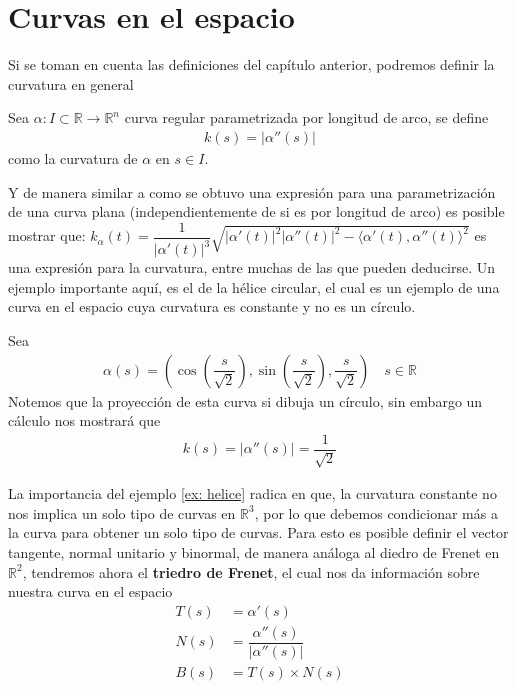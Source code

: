 \documentclass[oneside,11pt]{memoir}
\begin{document}
\section{Curvas en el espacio}
Si se toman en cuenta las definiciones del capítulo anterior, podremos definir la curvatura en general
\begin{definition}
    Sea $\alpha:I\subset \mathbb{R}\to\mathbb{R}^n$ curva regular parametrizada por longitud de arco, se define 
    \begin{align*}
        k(s)=|\alpha''(s)|
    \end{align*}
    como la curvatura de $\alpha$ en $s\in I$.
\end{definition}
Y de manera similar a como se obtuvo una expresión para una parametrización de una curva plana (independientemente de si es por longitud de arco) es posible mostrar que: $k_\alpha(t) =\dfrac{1}{|\alpha'(t)|^3}\sqrt{|\alpha'(t)|^2|\alpha''(t)|^2-\langle\alpha'(t),\alpha''(t)\rangle^2}$ es una expresión para la curvatura, entre muchas de las que pueden deducirse. Un ejemplo importante aquí, es el de la hélice circular, el cual es un ejemplo de una curva en el espacio cuya curvatura es constante y no es un círculo.
\begin{example}\label{ex: helice}
    Sea 
    \begin{align*}
        \alpha(s)=\left(\cos\left(\dfrac{s}{\sqrt{2}}\right),\sin\left(\dfrac{s}{\sqrt{2}}\right),\dfrac{s}{\sqrt{2}}\right)\quad s\in \mathbb{R}
    \end{align*}
    Notemos que la proyección de esta curva si dibuja un círculo, sin embargo un cálculo nos mostrará que
    \begin{align*}
        k(s)=|\alpha''(s)|=\dfrac{1}{\sqrt{2}}
    \end{align*}
\end{example}
La importancia del ejemplo \ref{ex: helice} radica en que, la curvatura constante no nos implica un solo tipo de curvas en $\mathbb{R}^3$, por lo que debemos condicionar más a la curva para obtener un solo tipo de curvas. Para esto es posible definir el vector tangente, normal unitario y binormal, de manera análoga al diedro de Frenet en $\mathbb{R}^2$, tendremos ahora el \textbf{triedro de Frenet}, el cual nos da información sobre nuestra curva en el espacio
\begin{align*}
    T(s)&=\alpha'(s)\\
    N(s)&=\dfrac{\alpha''(s)}{|\alpha''(s)|}\\
    B(s)&=T(s)\times N(s)
\end{align*}
\end{document}
